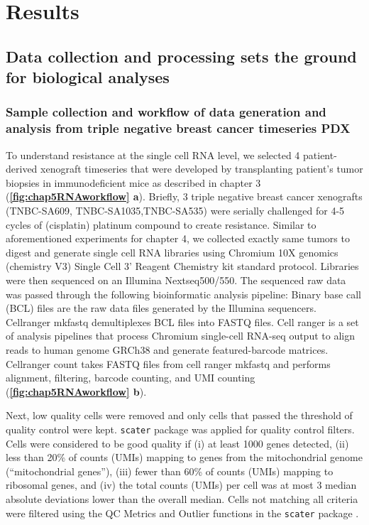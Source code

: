 \section{Results}
 

\subsection{Data collection and processing sets the ground for biological analyses} 
  
\subsubsection{Sample collection and workflow of data generation and analysis from triple negative breast cancer timeseries PDX}
To understand resistance at the single cell RNA level, we selected 4  patient-derived xenograft timeseries that were developed by transplanting patient's tumor biopsies in immunodeficient mice as described in chapter 3 (\textbf{\autoref{fig:chap5RNAworkflow} a}). 
Briefly, 3 triple negative breast cancer xenografts (TNBC-SA609, TNBC-SA1035,TNBC-SA535) were serially challenged for 4-5 cycles of (cisplatin) platinum compound to create resistance.
Similar to aforementioned experiments for chapter 4, we collected exactly same tumors to digest and generate single cell RNA libraries using Chromium 10X genomics (chemistry V3) Single Cell 3' Reagent Chemistry kit standard protocol. Libraries were then sequenced on an Illumina Nextseq500/550. The sequenced raw data was passed through the following bioinformatic analysis pipeline: 
Binary base call (BCL) files are the raw data files generated by the Illumina sequencers. Cellranger mkfastq demultiplexes BCL files into FASTQ files. Cell ranger is a set of analysis pipelines that process Chromium single-cell RNA-seq output to align reads to human genome GRCh38 and generate featured-barcode matrices. Cellranger count takes FASTQ files from cell ranger mkfastq and performs alignment, filtering, barcode counting, and UMI counting (\textbf{\autoref{fig:chap5RNAworkflow} b}). 

Next, low quality cells were removed and only cells that passed the threshold of quality control were kept. 
 \texttt{scater} package was applied for quality control filters. Cells were considered to be good quality if (i) at least 1000 genes detected, (ii) less than 20\% of counts (UMIs) mapping to genes from the mitochondrial genome (``mitochondrial genes''), (iii) fewer than 60\% of counts (UMIs) mapping to ribosomal genes, and (iv) the total counts (UMIs) per cell was at most 3 median absolute deviations lower than the overall median. Cells not matching all criteria were filtered using the \ac{QC} Metrics and Outlier functions in the \texttt{scater} package \cite{mccarthy2017scater}.

